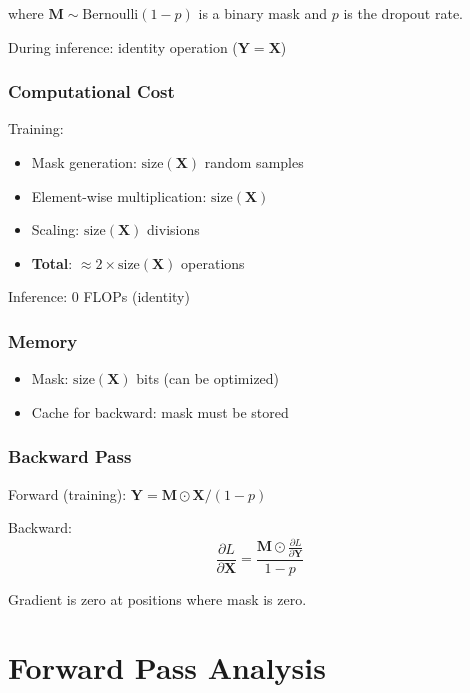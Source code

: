 \documentclass[10pt]{article}
\begin{document}
where $\mathbf{M} \sim \text{Bernoulli}(1-p)$ is a binary mask and $p$ is the dropout rate.

During inference: identity operation ($\mathbf{Y} = \mathbf{X}$)

\subsubsection{Computational Cost}

Training:
\begin{itemize}
  \item Mask generation: $\text{size}(\mathbf{X})$ random samples
  \item Element-wise multiplication: $\text{size}(\mathbf{X})$
  \item Scaling: $\text{size}(\mathbf{X})$ divisions
  \item \textbf{Total}: $\approx 2 \times \text{size}(\mathbf{X})$ operations
\end{itemize}

Inference: 0 FLOPs (identity)

\subsubsection{Memory}

\begin{itemize}
  \item Mask: $\text{size}(\mathbf{X})$ bits (can be optimized)
  \item Cache for backward: mask must be stored
\end{itemize}

\subsubsection{Backward Pass}

Forward (training): $\mathbf{Y} = \mathbf{M} \odot \mathbf{X} / (1-p)$

Backward:
\begin{equation}
\frac{\partial L}{\partial \mathbf{X}} = \frac{\mathbf{M} \odot \frac{\partial L}{\partial \mathbf{Y}}}{1-p}
\end{equation}

Gradient is zero at positions where mask is zero.

\newpage

\section{Forward Pass Analysis}
\label{sec:forward}
\end{document}

